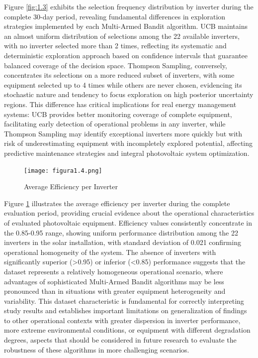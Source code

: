 \documentclass[conference]{IEEEtran}
\begin{document}
Figure \ref{fig:1.3} exhibits the selection frequency distribution by inverter during the complete 30-day period, revealing fundamental differences in exploration strategies implemented by each Multi-Armed Bandit algorithm. UCB maintains an almost uniform distribution of selections among the 22 available inverters, with no inverter selected more than 2 times, reflecting its systematic and deterministic exploration approach based on confidence intervals that guarantee balanced coverage of the decision space. Thompson Sampling, conversely, concentrates its selections on a more reduced subset of inverters, with some equipment selected up to 4 times while others are never chosen, evidencing its stochastic nature and tendency to focus exploration on high posterior uncertainty regions. This difference has critical implications for real energy management systems: UCB provides better monitoring coverage of complete equipment, facilitating early detection of operational problems in any inverter, while Thompson Sampling may identify exceptional inverters more quickly but with risk of underestimating equipment with incompletely explored potential, affecting predictive maintenance strategies and integral photovoltaic system optimization.

\begin{figure}[H]
\centering
\texttt{[image: figura1.4.png]}
\caption{Average Efficiency per Inverter}
\label{fig:1.4}
\end{figure}

Figure \ref{fig:1.4} illustrates the average efficiency per inverter during the complete evaluation period, providing crucial evidence about the operational characteristics of evaluated photovoltaic equipment. Efficiency values consistently concentrate in the 0.85-0.95 range, showing uniform performance distribution among the 22 inverters in the solar installation, with standard deviation of 0.021 confirming operational homogeneity of the system. The absence of inverters with significantly superior (>0.95) or inferior (<0.85) performance suggests that the dataset represents a relatively homogeneous operational scenario, where advantages of sophisticated Multi-Armed Bandit algorithms may be less pronounced than in situations with greater equipment heterogeneity and variability. This dataset characteristic is fundamental for correctly interpreting study results and establishes important limitations on generalization of findings to other operational contexts with greater dispersion in inverter performance, more extreme environmental conditions, or equipment with different degradation degrees, aspects that should be considered in future research to evaluate the robustness of these algorithms in more challenging scenarios.
\end{document}
